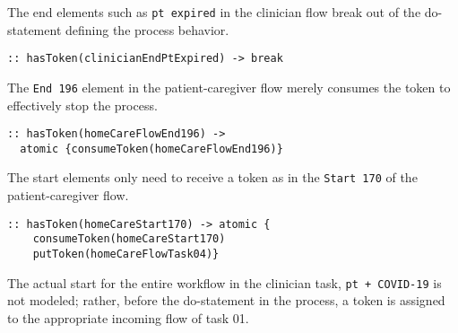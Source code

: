 The end elements such as \texttt{pt expired} in the clinician flow break out of the do-statement defining the process behavior.
%
{\small
\begin{lstlisting}[style=myPromela]
:: hasToken(clinicianEndPtExpired) -> break
\end{lstlisting}
}
%
\noindent The \texttt{End 196} element in the patient-caregiver flow merely consumes the token to effectively stop the process.
%
{\small
\begin{lstlisting}[style=myPromela]
:: hasToken(homeCareFlowEnd196) -> 
  atomic {consumeToken(homeCareFlowEnd196)}
\end{lstlisting}
}
% 
\noindent The start elements only need to receive a token as in the \texttt{Start 170} of the patient-caregiver flow.
%
{\small
\begin{lstlisting}[style=myPromela]
:: hasToken(homeCareStart170) -> atomic {
    consumeToken(homeCareStart170)
    putToken(homeCareFlowTask04)}
\end{lstlisting}
}
% 
\noindent The actual start for the entire workflow in the clinician task, \texttt{pt + COVID-19} is not modeled; rather, before the do-statement in the process, a token is assigned to the appropriate incoming flow of task 01.

\begin{comment}
Creating the actual Promela model is a tedious error-prone manual process. Some effort has been invested in naming, organizing, and formatting the model to make it more amenable to visual inspection. The visual inspection is the only process by which the structure of the flow in the Promela model is verified to match the structure of the flow in the BPMN graphical model.
\end{comment}
